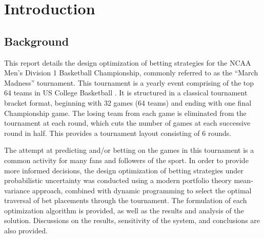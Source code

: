 \documentclass[12pt]{article}
\begin{document}


\dotableofcontents

\newpage
\doublespacing
{}
\section{Introduction}
\setlength{\parindent}{1cm}
\subsection{Background}
This report details the design optimization of betting strategies for the NCAA Men's Division 1 Basketball Championship, commonly referred to as the ``March Madness'' tournament.
This tournament is a yearly event comprising of the top 64 teams in US College Basketball \cite{doi:10.1080/00031305.1996.10473540}.
It is structured in a classical tournament bracket format, beginning with 32 games (64 teams) and ending with one final Championship game.
The losing team from each game is eliminated from the tournament at each round, which cuts the number of games at each successive round in half.
This provides a tournament layout consisting of 6 rounds.

The attempt at predicting and/or betting on the games in this tournament is a common activity for many fans and followers of the sport.
In order to provide more informed decisions, the design optimization of betting strategies under probabilistic uncertainty was conducted using a modern portfolio theory mean-variance approach, combined with dynamic programming to select the optimal traversal of bet placements through the tournament.
The formulation of each optimization algorithm is provided, as well as the results and analysis of the solution.
Discussions on the results, sensitivity of the system, and conclusions are also provided. 
\end{document}
